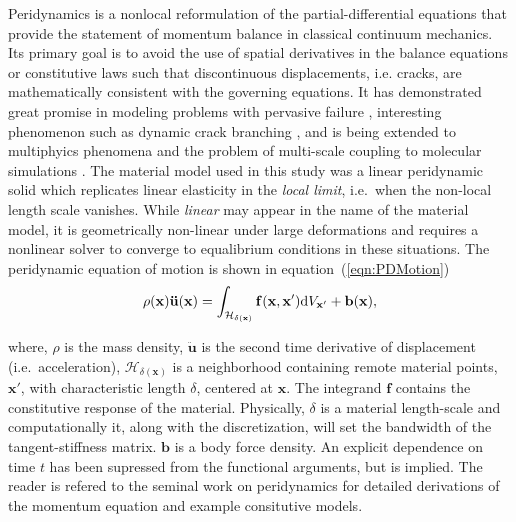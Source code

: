\documentclass[preprint,12pt]{elsarticle}
\begin{document}
 Peridynamics \cite{silling2000ret,silling:psa,silling2010peridynamic} is a nonlocal reformulation of the partial-differential equations that provide the statement of momentum balance in classical continuum mechanics. Its primary goal is to avoid the use of spatial derivatives in the balance equations or constitutive laws such that discontinuous displacements, i.e. cracks, are mathematically consistent with the governing equations. It has demonstrated great promise in modeling problems with pervasive failure \cite{littlewood2010}, interesting phenomenon such as dynamic crack branching \cite{ha2010sod}, and is being extended to multiphyics phenomena \cite{bobaru2011peridynamic,katiyar2013} and the problem of multi-scale coupling to molecular simulations \cite{seleson2009peridynamics,seleson2014atom,rahman2013b}.  The material model used in this study was a linear peridynamic solid which replicates linear elasticity in the \emph{local limit}, i.e.\ when the non-local length scale vanishes. While \emph{linear} may appear in the name of the material model, it is geometrically non-linear under large deformations and requires a nonlinear solver to converge to equalibrium conditions in these situations.  The peridynamic equation of motion is shown in equation~(\ref{eqn:PDMotion})
%
\begin{equation} 
    \rho(\mathbf{x})\mathbf{\ddot{u}(x)} = \int_{\mathcal{H_{\delta(\mathbf{x})}}} \mathbf{f(x,x'}) {\rm d}V_{\mathbf{x'}} + \mathbf{b(x)},
    \label{eqn:PDMotion}
\end{equation} 

where, $\rho$ is the mass density, $\mathbf{\ddot{u}}$ is the second time derivative of displacement (i.e.\ acceleration), $\mathcal{H}_{\delta(\mathbf{x})}$ is a neighborhood containing remote material points, $\mathbf{x'}$, with characteristic length $\delta$, centered at $\mathbf{x}$. The integrand $\mathbf{f}$ contains the constitutive response of the material.  Physically, $\delta$ is a material length-scale and computationally it, along with the discretization, will set the bandwidth of the tangent-stiffness matrix. $\mathbf{b}$ is a body force density.  An explicit dependence on time $t$ has been supressed from the functional arguments, but is implied.  The reader is refered to the seminal work on peridynamics \cite{silling:psa} for detailed derivations of the momentum equation and example consitutive models.
\end{document}
